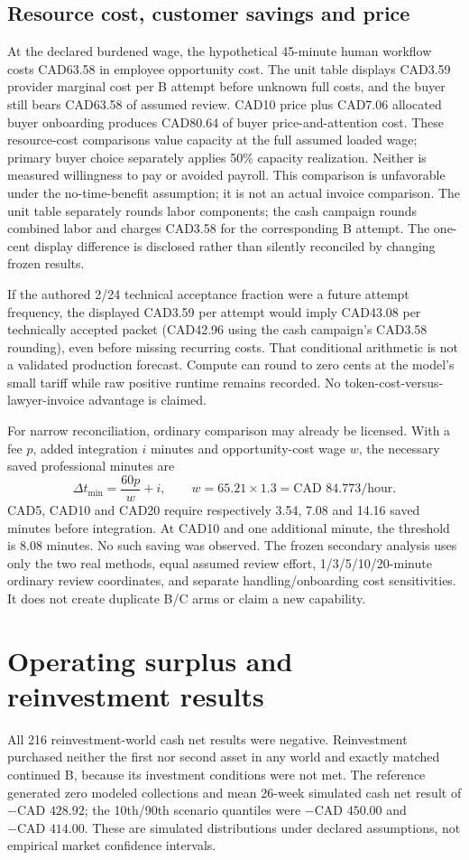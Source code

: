 \documentclass[10pt,a4paper]{article}
\newcommand{\money}[1]{\text{CAD }#1}
\begin{document}
\subsection{Resource cost, customer savings and price}
At the declared burdened wage, the hypothetical 45-minute human workflow costs CAD63.58 in employee opportunity cost. The unit table displays CAD3.59 provider marginal cost per B attempt before unknown full costs, and the buyer still bears CAD63.58 of assumed review. CAD10 price plus CAD7.06 allocated buyer onboarding produces CAD80.64 of buyer price-and-attention cost. These resource-cost comparisons value capacity at the full assumed loaded wage; primary buyer choice separately applies 50\% capacity realization. Neither is measured willingness to pay or avoided payroll. This comparison is unfavorable under the no-time-benefit assumption; it is not an actual invoice comparison. The unit table separately rounds labor components; the cash campaign rounds combined labor and charges CAD3.58 for the corresponding B attempt. The one-cent display difference is disclosed rather than silently reconciled by changing frozen results.

If the authored 2/24 technical acceptance fraction were a future attempt frequency, the displayed CAD3.59 per attempt would imply CAD43.08 per technically accepted packet (CAD42.96 using the cash campaign's CAD3.58 rounding), even before missing recurring costs. That conditional arithmetic is not a validated production forecast. Compute can round to zero cents at the model's small tariff while raw positive runtime remains recorded. No token-cost-versus-lawyer-invoice advantage is claimed.

For narrow reconciliation, ordinary comparison may already be licensed. With a fee $p$, added integration $i$ minutes and opportunity-cost wage $w$, the necessary saved professional minutes are
\[
\Delta t_{\min}=\frac{60p}{w}+i,\qquad w=65.21\times1.3=\money{84.773}\text{/hour}.
\]
CAD5, CAD10 and CAD20 require respectively 3.54, 7.08 and 14.16 saved minutes before integration. At CAD10 and one additional minute, the threshold is 8.08 minutes. No such saving was observed. The frozen secondary analysis uses only the two real methods, equal assumed review effort, 1/3/5/10/20-minute ordinary review coordinates, and separate handling/onboarding cost sensitivities. It does not create duplicate B/C arms or claim a new capability.

\section{Operating surplus and reinvestment results}
All 216 reinvestment-world cash net results were negative. Reinvestment purchased neither the first nor second asset in any world and exactly matched continued B, because its investment conditions were not met. The reference generated zero modeled collections and mean 26-week simulated cash net result of $-\money{428.92}$; the 10th/90th scenario quantiles were $-\money{450.00}$ and $-\money{414.00}$. These are simulated distributions under declared assumptions, not empirical market confidence intervals.
\end{document}
